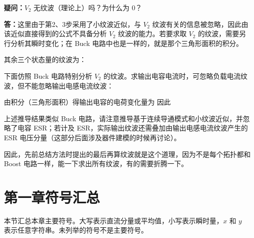 \textbf{疑问：}$V_2$ 无纹波（理论上）吗？为什么为 0？

\textbf{答：}这里由于第2、3步采用了小纹波近似，与 $V_2$ 纹波有关的信息被忽略，因此由该近似直接得到的公式不具备分析 $V_2$ 纹波的能力。若要求取 $V_2$ 的纹波，需要另行分析其瞬时变化；在 Buck 电路中也是一样的，就是那个三角形面积的积分。

其余三个状态量的纹波为：

下面仿照 Buck 电路特别分析 $V_2$ 的纹波。求输出电容电流时，可忽略负载电流纹波，但不能忽略输出电感电流纹波：


由积分（三角形面积）得输出电容的电荷变化量为
因此

上述推导结果类似 Buck 电路，请注意推导基于连续导通模式和小纹波近似，并忽略了电容 ESR；若计及 ESR，实际输出纹波还需叠加由输出电感电流纹波产生的 ESR 电压分量（这部分后面涉及器件建模的时候再讨论）。

因此，先前总结方法时提出的最后再算纹波就是这个道理，因为不是每个拓扑都和 Boost 电路一样，能一下求出所有纹波，有的需要折腾一下。

\clearpage

\section{第一章符号汇总}

本节汇总本章主要符号。大写表示直流分量或平均值，小写表示瞬时量，$x$ 和 $y$ 表示任意字符串。未列举的符号不是主要符号。


